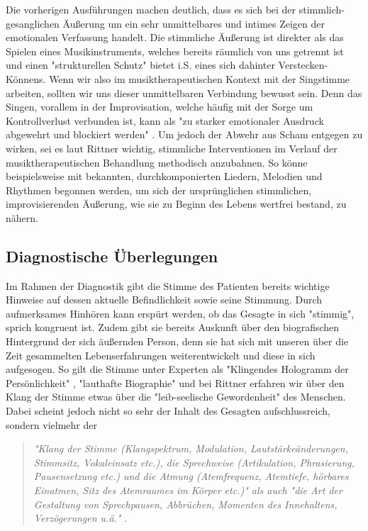 Die vorherigen Ausführungen machen deutlich, dass es sich bei der stimmlich-gesanglichen Äußerung um ein sehr unmittelbares und intimes Zeigen der emotionalen Verfassung handelt. Die stimmliche Äußerung ist direkter als das Spielen eines Musikinstruments, welches bereits räumlich von uns getrennt ist und einen "strukturellen Schutz" \autocite[110]{rittner1990} bietet i.S. eines sich dahinter Verstecken-Könnens. Wenn wir also im musiktherapeutischen Kontext mit der Singstimme arbeiten, sollten wir uns dieser unmittelbaren Verbindung bewusst sein. Denn das Singen, vorallem in der Improvisation, welche häufig mit der Sorge um Kontrollverlust verbunden ist, kann als "zu starker emotionaler Ausdruck abgewehrt und blockiert werden" \autocite[485]{rittner2009a}. Um jedoch der Abwehr aus Scham entgegen zu wirken, sei es laut Rittner wichtig, stimmliche Interventionen im Verlauf der musiktherapeutischen Behandlung methodisch anzubahnen. So könne beispielsweise mit bekannten, durchkomponierten Liedern, Melodien und Rhythmen begonnen werden, um sich der ursprünglichen stimmlichen, improvisierenden Äußerung, wie sie zu Beginn des Lebens wertfrei bestand, zu nähern. 

\subsection{Diagnostische Überlegungen}
\label{subsection:diagnostische_ueberlegungen}
Im Rahmen der Diagnostik gibt die Stimme des Patienten bereits wichtige Hinweise auf dessen aktuelle Befindlichkeit sowie seine Stimmung. Durch aufmerksames Hinhören kann erspürt werden, ob das Gesagte in sich "stimmig", sprich kongruent ist. Zudem gibt sie bereits Auskunft über den biografischen Hintergrund der sich äußernden Person, denn sie hat sich mit unseren über die Zeit gesammelten Lebenserfahrungen weiterentwickelt und diese in sich aufgesogen. So gilt die Stimme unter Experten als "Klingendes Hologramm der Persönlichkeit" \autocite{adamek1999}, "lauthafte Biographie" \autocite{gundermann1994} und bei Rittner erfahren wir über den Klang der Stimme etwas über die "leib-seelische Gewordenheit" \autocite[211]{rittner2008} des Menschen.
Dabei scheint jedoch nicht so sehr der Inhalt des Gesagten aufschlussreich, sondern vielmehr der 

\begin{quote}
\emph{"Klang der Stimme (Klangspektrum, Modulation, Lautstärkeänderungen, Stimmsitz, Vokaleinsatz etc.), die Sprechweise (Artikulation, Phrasierung, Pausensetzung etc.) und die Atmung (Atemfrequenz, Atemtiefe, hörbares Einatmen, Sitz des Atemraumes im Körper etc.)" als auch "die Art der Gestaltung von Sprechpausen, Abbrüchen, Momenten des Innehaltens, Verzögerungen u.ä."} \autocite[210]{rittner2008}. 
\end{quote}

